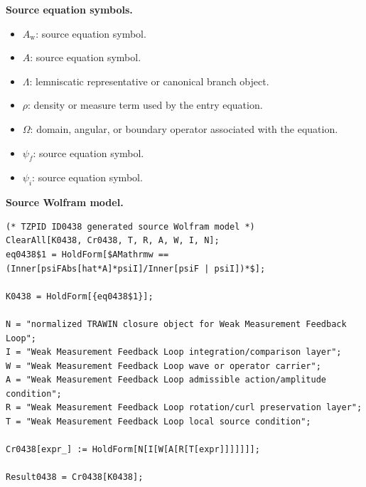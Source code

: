 \begin{minipage}[t]{0.49\linewidth}
\begingroup
\small
\raggedright
\textbf{Source equation symbols.}\par
\begin{itemize}[leftmargin=1.35em,itemsep=1pt,topsep=1pt,parsep=0pt]
    \item $A_{\mathrm{w}}$: source equation symbol.
    \item $A$: source equation symbol.
    \item $\Lambda$: lemniscatic representative or canonical branch object.
    \item $\rho$: density or measure term used by the entry equation.
    \item $\Omega$: domain, angular, or boundary operator associated with the equation.
    \item $\psi_{f}$: source equation symbol.
    \item $\psi_{i}$: source equation symbol.
\end{itemize}
\endgroup
\end{minipage}\hfill
\begin{minipage}[t]{0.47\linewidth}
\begingroup
\scriptsize
\raggedright
\textbf{Source Wolfram model.}\par
\begin{Verbatim}[fontsize=\tiny,breaklines=true,breakanywhere=true]
(* TZPID ID0438 generated source Wolfram model *)
ClearAll[K0438, Cr0438, T, R, A, W, I, N];
eq0438$1 = HoldForm[$AMathrmw == (Inner[psiFAbs[hat*A]*psiI]/Inner[psiF | psiI])*$];

K0438 = HoldForm[{eq0438$1}];

N = "normalized TRAWIN closure object for Weak Measurement Feedback Loop";
I = "Weak Measurement Feedback Loop integration/comparison layer";
W = "Weak Measurement Feedback Loop wave or operator carrier";
A = "Weak Measurement Feedback Loop admissible action/amplitude condition";
R = "Weak Measurement Feedback Loop rotation/curl preservation layer";
T = "Weak Measurement Feedback Loop local source condition";

Cr0438[expr_] := HoldForm[N[I[W[A[R[T[expr]]]]]]];

Result0438 = Cr0438[K0438];
\end{Verbatim}
\endgroup
\end{minipage}

